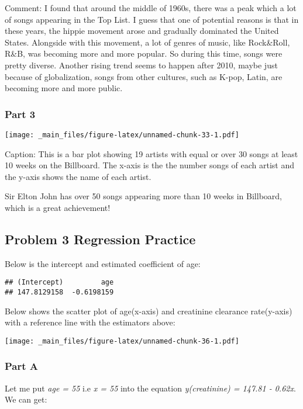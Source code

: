 \documentclass[
]{article}
\begin{document}
Comment: I found that around the middle of 1960s, there was a peak which a lot of songs appearing in the Top List. I guess that one of potential reasons is that in these years, the hippie movement arose and gradually dominated the United States. Alongside with this movement, a lot of genres of music, like Rock\&Roll, R\&B, was becoming more and more popular. So during this time, songs were pretty diverse. Another rising trend seems to happen after 2010, maybe just because of globalization, songs from other cultures, such as K-pop, Latin, are becoming more and more public.

\hypertarget{part-3}{%
\subsubsection{Part 3}\label{part-3}}

\texttt{[image: \_main\_files/figure-latex/unnamed-chunk-33-1.pdf]}

Caption: This is a bar plot showing 19 artists with equal or over 30 songs at least 10 weeks on the Billboard. The x-axis is the the number songs of each artist and the y-axis shows the name of each artist.

Sir Elton John has over 50 songs appearing more than 10 weeks in Billboard, which is a great achievement!

\hypertarget{problem-3-regression-practice}{%
\subsection{Problem 3 Regression Practice}\label{problem-3-regression-practice}}

Below is the intercept and estimated coefficient of age:

\begin{verbatim}
## (Intercept)         age 
## 147.8129158  -0.6198159
\end{verbatim}

Below shows the scatter plot of age(x-axis) and creatinine clearance rate(y-axis) with a reference line with the estimators above:

\texttt{[image: \_main\_files/figure-latex/unnamed-chunk-36-1.pdf]}

\hypertarget{part-a-4}{%
\subsubsection{Part A}\label{part-a-4}}

Let me put \emph{age = 55} i.e \emph{x = 55} into the equation \emph{y(creatinine) = 147.81 - 0.62x}. We can get:
\end{document}
